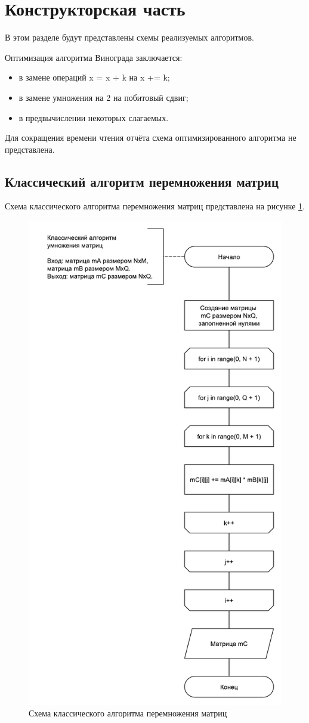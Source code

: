 \section{Конструкторская часть}

В этом разделе будут представлены схемы реализуемых алгоритмов.

Оптимизация алгоритма Винограда заключается:
\begin{itemize}
	\item в замене операций x = x + k на x += k;
	\item в замене умножения на 2 на побитовый сдвиг;
	\item в предвычислении некоторых слагаемых.
\end{itemize}

Для сокращения времени чтения отчёта схема оптимизированного алгоритма не представлена.

\newpage

\subsection{Классический алгоритм перемножения матриц}

Схема классического алгоритма перемножения матриц представлена на рисунке \ref{fig:classic}.
\begin{figure}
	\centering
	\includegraphics[width=0.6\linewidth]{images/classic}
	\caption{Схема классического алгоритма перемножения матриц}
	\label{fig:classic}
\end{figure}

